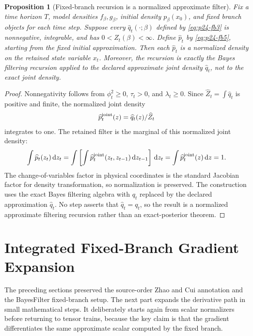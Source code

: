 \documentclass[11pt]{article}
\newtheorem{proposition}{Proposition}
\numberwithin{equation}{section}
\newcommand{\dd}{\,\mathrm d}
\begin{document}
\begin{proposition}[Fixed-branch recursion is a normalized approximate filter]
Fix a time horizon \(T\), model densities \(f_\beta,g_\beta\), initial density
\(p_\beta(x_0)\), and fixed branch objects for each time step.  Suppose every
\(\widehat q_t(\cdot;\beta)\) defined by \eqref{eq:p24-fb3} is nonnegative, integrable, and
has \(0<\widehat Z_t(\beta)<\infty\).  Define \(\widehat p_t\) by \eqref{eq:p24-fb5},
starting from the fixed initial approximation.  Then each \(\widehat p_t\) is a
normalized density on the retained state variable \(x_t\).  Moreover, the
recursion is exactly the Bayes filtering recursion applied to the declared
approximate joint density \(\widehat q_t\), not to the exact joint density.
\end{proposition}

\begin{proof}
Nonnegativity follows from
\(\phi_t^2\ge0\), \(\tau_t>0\), and \(\lambda_t\ge0\).  Since
\(\widehat Z_t=\int\widehat q_t\) is positive and finite, the normalized joint
density
\[
    \widehat p_t^{\rm joint}(z)
    =
    \widehat q_t(z)/\widehat Z_t
\]
integrates to one.  The retained filter is the marginal of this normalized
joint density:
\[
    \int \widehat p_t(z_t)\dd z_t
    =
    \int
    \left[
    \int \widehat p_t^{\rm joint}(z_t,z_{t-1})\dd z_{t-1}
    \right]\dd z_t
    =
    \int \widehat p_t^{\rm joint}(z)\dd z
    =
    1.
\]
The change-of-variables factor in physical coordinates is the standard
Jacobian factor for density transformation, so normalization is preserved.  The
construction uses the exact Bayes filtering algebra with \(q_t\) replaced by
the declared approximation \(\widehat q_t\).  No step asserts that
\(\widehat q_t=q_t\), so the result is a normalized approximate filtering
recursion rather than an exact-posterior theorem.
\end{proof}


\section{Integrated Fixed-Branch Gradient Expansion}

The preceding sections preserved the source-order Zhao and Cui \cite{zhao2024ttsequential} annotation and the
BayesFilter fixed-branch setup.  The next part expands the derivative path in
small mathematical steps.  It deliberately starts again from scalar
normalizers before returning to tensor trains, because the key claim is that
the gradient differentiates the same approximate scalar computed by the fixed
branch.
\end{document}
